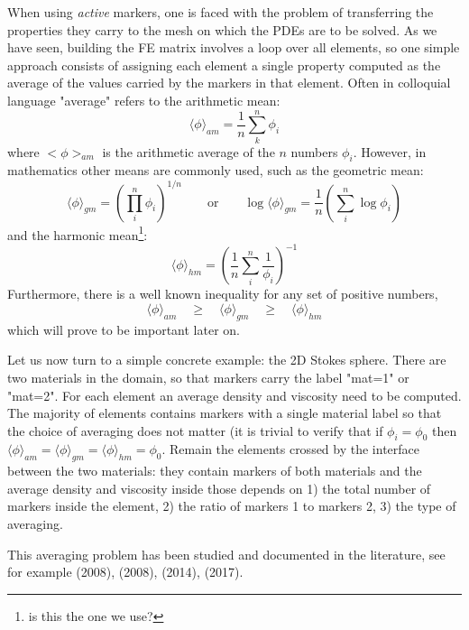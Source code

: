 When using {\it active} markers, one is faced with the problem of transferring the properties they carry to the mesh on which the PDEs are to be solved. 
As we have seen, building the FE matrix involves a loop over all elements, so one simple approach consists of assigning each element a single property
computed as the average of the values carried by the markers in that element. 
Often in colloquial language "average" refers to the arithmetic mean: 
\begin{equation}
\langle \phi \rangle_{am}=\frac{1}{n} \sum_k^n \phi_i 
\end{equation}
where $<\phi>_{am}$ is the arithmetic average of the $n$ numbers $\phi_i$. 
However, in mathematics other means are commonly used, such as the geometric mean: 
\begin{equation}
\langle \phi \rangle_{gm}=\left( \prod_i^n \phi_i \right)^{1/n}
\qquad
\text{or}
\qquad
\log \langle \phi \rangle_{gm}= \frac{1}{n} \left( \sum_i^n \log \phi_i \right)
\end{equation}
and the harmonic mean\footnote{is this the one we use?}: 
\begin{equation}
\langle \phi \rangle_{hm}=\left( \frac{1}{n}\sum_i^n \frac{1}{\phi_i} \right)^{-1}
\end{equation}
Furthermore, there is a well known inequality for any set of positive numbers,
\begin{equation}
\langle \phi \rangle_{am}\quad  \geq \quad
\langle \phi \rangle_{gm}\quad  \geq \quad
\langle \phi \rangle_{hm} 
\end{equation}
which will prove to be important later on. 

Let us now turn to a simple concrete example: the 2D Stokes sphere. 
There are two materials in the domain, so that markers carry the label "mat=1" or "mat=2".
For each element an average density and viscosity need to be computed. The majority of elements contains markers
with a single material label so that the choice of averaging does not matter (it is trivial to verify that 
if $\phi_i=\phi_0$ then $\langle \phi \rangle_{am}=\langle \phi \rangle_{gm}=\langle \phi \rangle_{hm}=\phi_0$.
Remain the elements crossed by the interface between the two materials: they contain markers of both materials
and the average density and viscosity inside those depends on 1) the total number of markers inside the element, 
2) the ratio of markers 1 to markers 2, 3) the type of averaging. 

This averaging problem has been studied and documented in the literature, see
for example 
\textcite{scbe08} (2008), \textcite{deka08} (2008), \textcite{thmk14} (2014), 
\textcite{pukp17} (2017).

